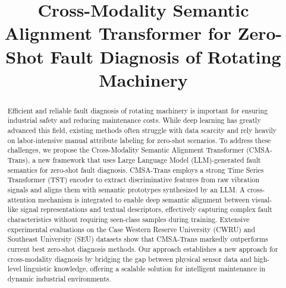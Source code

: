 \documentclass[journal]{IEEEtran}
\begin{document}
\title{Cross-Modality Semantic Alignment Transformer for Zero-Shot Fault Diagnosis of Rotating Machinery}

\author{%
}


\maketitle

\begin{abstract}
Efficient and reliable fault diagnosis of rotating machinery is important for ensuring industrial safety and reducing maintenance costs. While deep learning has greatly advanced this field, existing methods often struggle with data scarcity and rely heavily on labor-intensive manual attribute labeling for zero-shot scenarios. To address these challenges, we propose the Cross-Modality Semantic Alignment Transformer (CMSA-Trans), a new framework that uses Large Language Model (LLM)-generated fault semantics for zero-shot fault diagnosis. CMSA-Trans employs a strong Time Series Transformer (TST) encoder to extract discriminative features from raw vibration signals and aligns them with semantic prototypes synthesized by an LLM. A cross-attention mechanism is integrated to enable deep semantic alignment between visual-like signal representations and textual descriptors, effectively capturing complex fault characteristics without requiring seen-class samples during training. Extensive experimental evaluations on the Case Western Reserve University (CWRU) and Southeast University (SEU) datasets show that CMSA-Trans markedly outperforms current best zero-shot diagnosis methods. Our approach establishes a new approach for cross-modality diagnosis by bridging the gap between physical sensor data and high-level linguistic knowledge, offering a scalable solution for intelligent maintenance in dynamic industrial environments.
\end{abstract}
\end{document}
